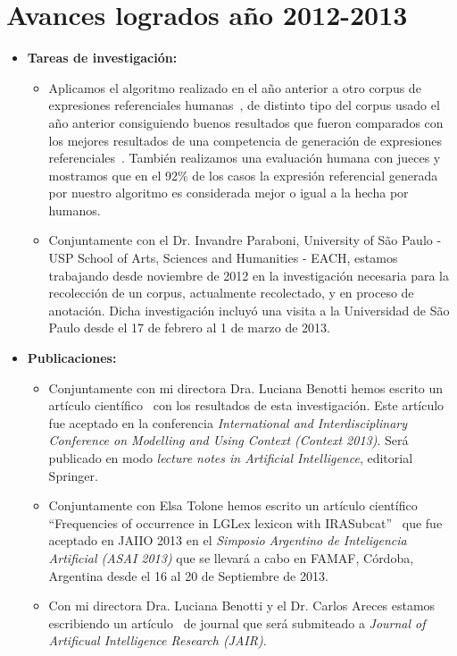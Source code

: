 \section{Avances logrados a\~no 2012-2013 }
\label{progreso}

\begin{itemize}
\item \textbf{Tareas de investigaci\'on:}
\begin{itemize}
\item Aplicamos el algoritmo realizado en el a\~no anterior a otro corpus de expresiones referenciales humanas~\cite{gatt-balz-kow:2008:ENLG}, de distinto tipo del corpus usado el a\~no anterior consiguiendo buenos resultados que fueron comparados con los mejores resultados de una competencia de generaci\'on de expresiones referenciales~\cite{KrahmerGRAPH}. Tambi\'en realizamos una evaluaci\'on humana con jueces y mostramos que en el 92\% de los casos la expresi\'on referencial generada por nuestro algoritmo es considerada mejor o igual a la hecha por humanos.

\item Conjuntamente con el Dr. Invandre Paraboni, University of S\~ao Paulo - USP 
School of Arts, Sciences and Humanities - EACH, estamos trabajando desde noviembre de 2012 en la investigaci\'on necesaria para la recolecci\'on de un corpus, actualmente recolectado, y en proceso de anotaci\'on. Dicha investigaci\'on incluy\'o una visita a la Universidad de S\~ao Paulo desde el 17 de febrero al 1 de marzo de 2013.
\end{itemize}
\item \textbf{Publicaciones:} 
\begin{itemize}
\item Conjuntamente con mi directora Dra. Luciana Benotti hemos escrito un art\'iculo cient\'ifico~\cite{benotti-altamirano-context2013} con los resultados de esta investigaci\'on. Este art\'iculo fue aceptado en la conferencia \emph{International and Interdisciplinary Conference on Modelling and Using Context (Context 2013)}. Ser\'a publicado en modo \emph{lecture notes in Artificial Intelligence}, editorial Springer. 
\item Conjuntamente con Elsa Tolone hemos escrito un art\'iculo cient\'ifico ``Frequencies of occurrence in LGLex lexicon with IRASubcat''~\cite{tolone-altamirano} que fue aceptado en JAIIO 2013 en el \emph{Simposio Argentino de Inteligencia Artificial (ASAI 2013)} que se llevar\'a a cabo en FAMAF, C\'ordoba, Argentina desde el 16 al 20 de Septiembre de 2013.
\item Con mi directora Dra. Luciana Benotti y el Dr. Carlos Areces estamos escribiendo un art\'iculo~\cite{benotti-altamirano-jair} de journal que ser\'a submiteado a \emph{Journal of Artificual Intelligence Research (JAIR)}.
\end{itemize}


\end{itemize}
